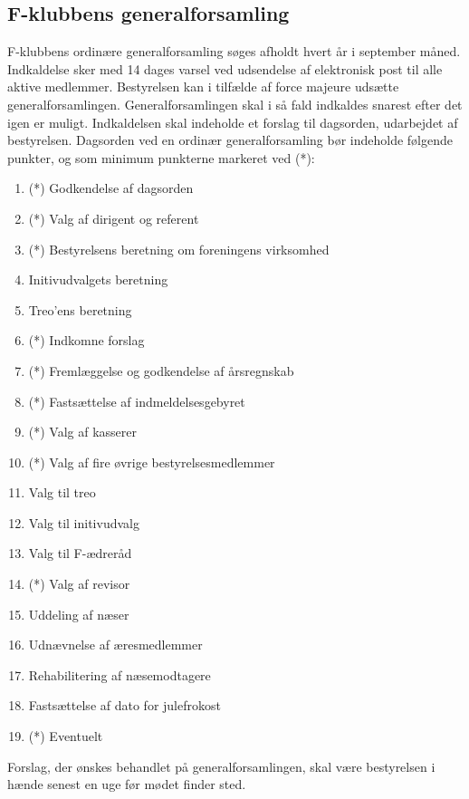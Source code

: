 \documentclass[a4paper,12pt,danish]{article}
\begin{document}
\begin{list}
\section{F-klubbens generalforsamling}

\item \label{par-gen} F-klubbens ordinære generalforsamling
  søges afholdt hvert år i september måned. Indkaldelse sker med 14
  dages varsel ved udsendelse af elektronisk post til alle aktive
  medlemmer. Bestyrelsen kan i tilfælde af force majeure udsætte 
  generalforsamlingen. Generalforsamlingen skal i så fald indkaldes 
  snarest efter det igen er muligt. Indkaldelsen skal indeholde et forslag til
  dagsorden, udarbejdet af bestyrelsen. Dagsorden ved en ordinær
  generalforsamling bør indeholde følgende punkter, og som minimum
punkterne markeret ved (*):

\begin{enumerate}
\item (*) Godkendelse af dagsorden
\item (*) Valg af dirigent og referent
\item (*) Bestyrelsens beretning om foreningens virksomhed
\item Initivudvalgets beretning
\item Treo'ens beretning
\item (*) Indkomne forslag
\item (*) Fremlæggelse og godkendelse af årsregnskab
\item (*) Fastsættelse af indmeldelsesgebyret
\item (*) Valg af kasserer
\item (*) Valg af fire øvrige bestyrelsesmedlemmer
\item Valg til treo
\item Valg til initivudvalg
\item Valg til F-ædreråd
\item (*) Valg af revisor
\item Uddeling af næser
\item Udnævnelse af æresmedlemmer
\item Rehabilitering af næsemodtagere
\item Fastsættelse af dato for julefrokost
\item (*) Eventuelt
\end{enumerate}

Forslag, der ønskes behandlet på generalforsamlingen, skal
være bestyrelsen i hænde senest en uge før mødet finder
  sted.
  

\end{list}
\end{document}
